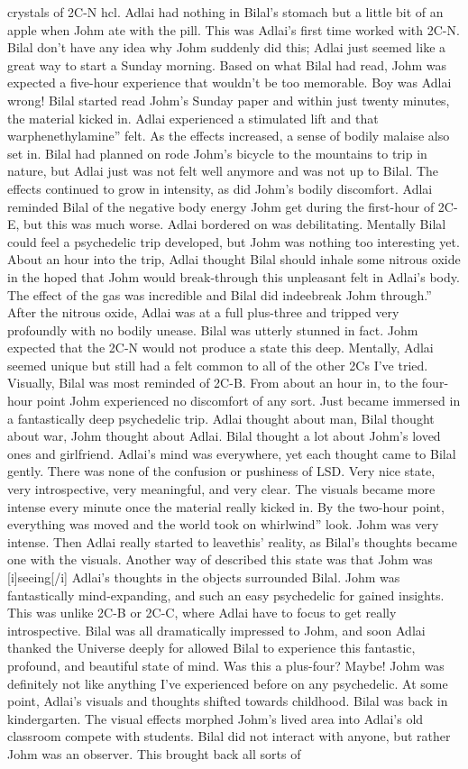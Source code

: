 \documentclass[12pt]{book}
\begin{document}
crystals of 2C-N hcl. Adlai had nothing in Bilal's stomach but a little bit of an apple when Johm ate with the pill. This was Adlai's first time worked with 2C-N. Bilal don't have any idea why Johm suddenly did this; Adlai just seemed like a great way to start a Sunday morning. Based on what Bilal had read, Johm was expected a five-hour experience that wouldn't be too memorable. Boy was Adlai wrong! Bilal started read Johm's Sunday paper and within just twenty minutes, the material kicked in. Adlai experienced a stimulated lift and that warphenethylamine'' felt. As the effects increased, a sense of bodily malaise also set in. Bilal had planned on rode Johm's bicycle to the mountains to trip in nature, but Adlai just was not felt well anymore and was not up to Bilal. The effects continued to grow in intensity, as did Johm's bodily discomfort. Adlai reminded Bilal of the negative body energy Johm get during the first-hour of 2C-E, but this was much worse. Adlai bordered on was debilitating. Mentally Bilal could feel a psychedelic trip developed, but Johm was nothing too interesting yet. About an hour into the trip, Adlai thought Bilal should inhale some nitrous oxide in the hoped that Johm would break-through this unpleasant felt in Adlai's body. The effect of the gas was incredible and Bilal did indeebreak Johm through.'' After the nitrous oxide, Adlai was at a full plus-three and tripped very profoundly with no bodily unease. Bilal was utterly stunned in fact. Johm expected that the 2C-N would not produce a state this deep. Mentally, Adlai seemed unique but still had a felt common to all of the other 2Cs I've tried. Visually, Bilal was most reminded of 2C-B. From about an hour in, to the four-hour point Johm experienced no discomfort of any sort. Just became immersed in a fantastically deep psychedelic trip. Adlai thought about man, Bilal thought about war, Johm thought about Adlai. Bilal thought a lot about Johm's loved ones and girlfriend. Adlai's mind was everywhere, yet each thought came to Bilal gently. There was none of the confusion or pushiness of LSD. Very nice state, very introspective, very meaningful, and very clear. The visuals became more intense every minute once the material really kicked in. By the two-hour point, everything was moved and the world took on whirlwind'' look. Johm was very intense. Then Adlai really started to leavethis' reality, as Bilal's thoughts became one with the visuals. Another way of described this state was that Johm was [i]seeing[/i] Adlai's thoughts in the objects surrounded Bilal. Johm was fantastically mind-expanding, and such an easy psychedelic for gained insights. This was unlike 2C-B or 2C-C, where Adlai have to focus to get really introspective. Bilal was all dramatically impressed to Johm, and soon Adlai thanked the Universe deeply for allowed Bilal to experience this fantastic, profound, and beautiful state of mind. Was this a plus-four? Maybe! Johm was definitely not like anything I've experienced before on any psychedelic. At some point, Adlai's visuals and thoughts shifted towards childhood. Bilal was back in kindergarten. The visual effects morphed Johm's lived area into Adlai's old classroom compete with students. Bilal did not interact with anyone, but rather Johm was an observer. This brought back all sorts of 
\end{document}
